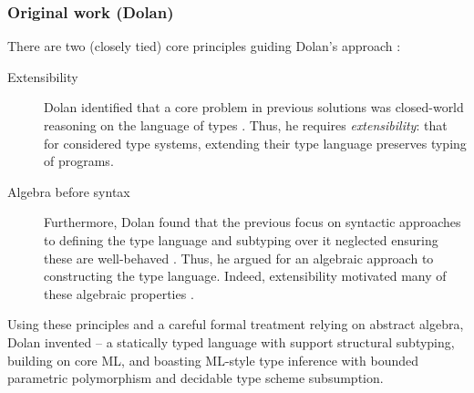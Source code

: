 \subsubsection{Original work (Dolan)}
There are two (closely tied) core principles guiding Dolan's approach \cite[Section~1.3]{dolan-thesis}: \begin{description}
    \item[Extensibility] Dolan identified that a core problem in previous solutions was closed-world reasoning on the language of types \cite[Section~1.3.1]{dolan-thesis}. Thus, he requires \emph{extensibility}: that for considered type systems, extending their type language preserves typing of programs.
    \item[Algebra before syntax] Furthermore, Dolan found that the previous focus on syntactic approaches to defining the type language and subtyping over it neglected ensuring these are well-behaved \cite[Section~1.3.2]{dolan-thesis}. Thus, he argued for an algebraic approach to constructing the type language. Indeed, extensibility motivated many of these algebraic properties \cite[Section~2.1.5]{dolan-thesis}.
\end{description}
Using these principles and a careful formal treatment relying on abstract algebra, Dolan invented \mlsub{} -- a statically typed language with support structural subtyping, building on core ML, and boasting ML-style type inference with bounded parametric polymorphism and decidable type scheme subsumption.

